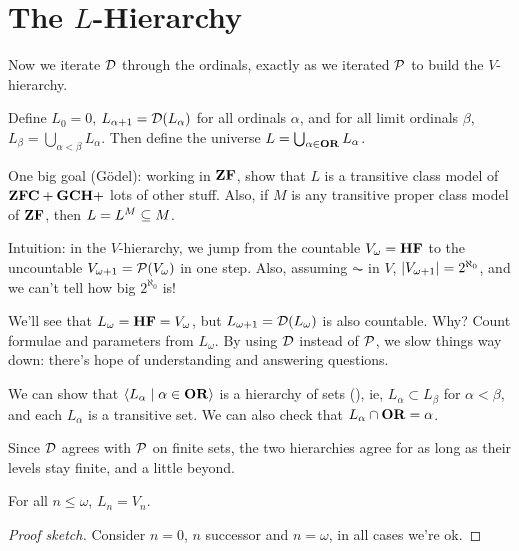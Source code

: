 \section{The $L$-Hierarchy}

Now we iterate $\mathcal{D}$ through the ordinals, exactly as we iterated $\mathcal{P}$ to build the $V$-hierarchy.

\begin{boxdefinition}
    Define $L_0 = 0$, $L_{\alpha + 1} = \mathcal{D}\!\left( L_{\alpha} \right)$ for all ordinals $\alpha$, and for all limit ordinals $\beta$, $L_{\beta} = \bigcup_{\alpha < \beta} L_{\alpha}$. Then define the universe $L = \bigcup_{\alpha \in \mathbf{OR}} L_{\alpha}$.
\end{boxdefinition}


One big goal (Gödel): working in $\mathbf{ZF}$, show that $L$ is a transitive class model of $\mathbf{ZFC} + \mathbf{GCH} +$ lots of other stuff. Also, if $M$ is any transitive proper class model of $\mathbf{ZF}$, then $L = L^M \subseteq M$.

Intuition: in the $V$-hierarchy, we jump from the countable $V_{\omega} = \mathbf{HF}$ to the uncountable $V_{\omega + 1} = \mathcal{P}\!\left( V_{\omega} \right)$ in one step. Also, assuming $\AC$ in $V$, $\left\lvert V_{\omega + 1} \right\rvert = 2^{\aleph_0}$, and we can't tell how big $2^{\aleph_0}$ is!

We'll see that $L_{\omega} = \mathbf{HF} = V_{\omega}$, but $L_{\omega + 1} = \mathcal{D}\!\left( L_{\omega} \right)$ is also countable. Why? Count formulae and parameters from $L_{\omega}$. By using $\mathcal{D}$ instead of $\mathcal{P}$, we slow things way down: there's hope of understanding and answering questions.

We can show that $\left\langle L_{\alpha} \; \middle| \; \alpha \in \mathbf{OR} \right\rangle$ is a hierarchy of sets (), ie, $L_{\alpha} \subset L_{\beta}$ for $\alpha < \beta$, and each $L_{\alpha}$ is a transitive set. We can also check that $L_{\alpha} \cap \mathbf{OR} = \alpha$.

Since $\mathcal{D}$ agrees with $\mathcal{P}$ on finite sets, the two hierarchies agree for as long as their levels stay finite, and a little beyond.

\begin{boxcorollary}
    For all $n \leq \omega$, $L_n = V_n$.
\end{boxcorollary}
\begin{proof}[Proof sketch]
    Consider $n = 0$, $n$ successor and $n = \omega$, in all cases we're ok.
\end{proof}

